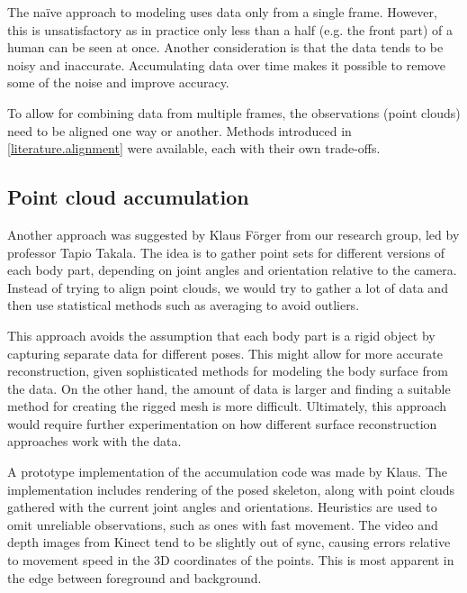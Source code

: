 The naïve approach to modeling uses data only from a single frame. However, this is unsatisfactory as in practice only less than a half (e.g. the front part) of a human can be seen at once. Another consideration is that the data tends to be noisy and inaccurate. Accumulating data over time makes it possible to remove some of the noise and improve accuracy.

To allow for combining data from multiple frames, the observations (point clouds) need to be aligned one way or another. Methods introduced in \autoref{literature.alignment} were available, each with their own trade-offs.


\subsection{Point cloud accumulation}


Another approach was suggested by Klaus Förger from our research group, led by professor Tapio Takala. The idea is to gather point sets for different versions of each body part, depending on joint angles and orientation relative to the camera. Instead of trying to align point clouds, we would try to gather a lot of data and then use statistical methods such as averaging to avoid outliers.

This approach avoids the assumption that each body part is a rigid object by capturing separate data for different poses. This might allow for more accurate reconstruction, given sophisticated methods for modeling the body surface from the data. On the other hand, the amount of data is larger and finding a suitable method for creating the rigged mesh is more difficult. Ultimately, this approach would require further experimentation on how different surface reconstruction approaches work with the data.

A prototype implementation of the accumulation code was made by Klaus. The implementation includes rendering of the posed skeleton, along with point clouds gathered with the current joint angles and orientations. Heuristics are used to omit unreliable observations, such as ones with fast movement. The video and depth images from Kinect tend to be slightly out of sync, causing errors relative to movement speed in the 3D coordinates of the points. This is most apparent in the edge between foreground and background.


